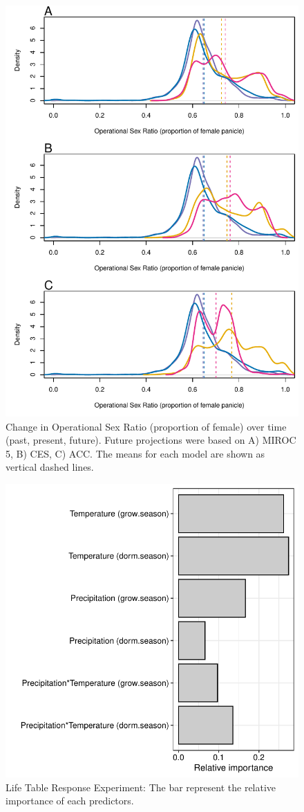 \documentclass[12pt]{article}\usepackage[]{graphicx}\usepackage[dvipsnames]{xcolor}
\begin{document}
\begin{figure}[H]
	\begin{center}
		\includegraphics[width=0.80\linewidth]{Figures/POAR_OSR_MIROC_CES_ACC.pdf}
		\caption{Change in Operational Sex Ratio (proportion of female) over time (past, present, future).
			Future projections were based on A) MIROC 5, B) CES, C) ACC.
			The means for each model are shown as vertical dashed lines.}
		\label{Sup:osrall}
	\end{center}
\end{figure}

\begin{figure}[H]
	\begin{center}
		\includegraphics[width=0.65\linewidth]{Figures/Fig_LTRE.pdf}
		\caption{Life Table Response Experiment: The bar represent the relative importance of each predictors.}
		\label{Sup:LTRE}
	\end{center}
\end{figure}
\end{document}
